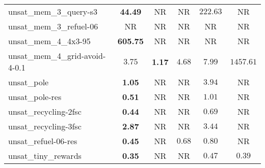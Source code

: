 \begin{tabular}{lccccc}
unsat\_mem\_3\_query-s3 & \textbf{44.49} & NR & NR & $222.63$ & NR \\
unsat\_mem\_3\_refuel-06 & NR & NR & NR & NR & NR \\
unsat\_mem\_4\_4x3-95 & \textbf{605.75} & NR & NR & NR & NR \\
unsat\_mem\_4\_grid-avoid-4-0.1 & $3.75$ & \textbf{1.17} & $4.68$ & $7.99$ & $1457.61$ \\
unsat\_pole & \textbf{1.05} & NR & NR & $3.94$ & NR \\
unsat\_pole-res & \textbf{0.51} & NR & NR & $1.01$ & NR \\
unsat\_recycling-2fsc & \textbf{0.44} & NR & NR & $0.69$ & NR \\
unsat\_recycling-3fsc & \textbf{2.87} & NR & NR & $3.44$ & NR \\
unsat\_refuel-06-res & \textbf{0.45} & NR & $0.68$ & $0.80$ & NR \\
unsat\_tiny\_rewards & \textbf{0.35} & NR & NR & $0.47$ & $0.39$ \\
\bottomrule
\end{tabular}
